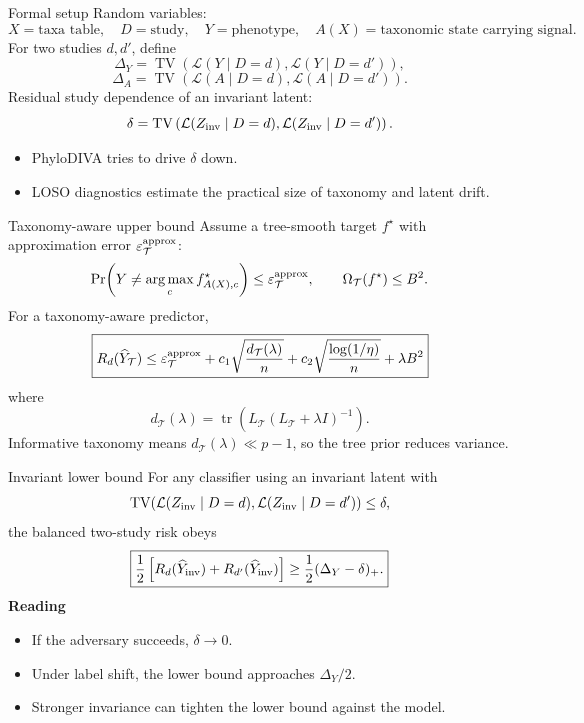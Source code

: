 \documentclass[aspectratio=169,10pt]{beamer}
\newcommand{\TV}{\operatorname{TV}}
\newcommand{\T}{\mathcal T}
\newcommand{\tr}{\operatorname{tr}}
\newcommand{\argmax}{\operatorname*{arg\,max}}
\begin{document}
\begin{frame}{Formal setup}
\small
Random variables:
\[
X=\text{taxa table},\quad D=\text{study},\quad Y=\text{phenotype},\quad
A(X)=\text{taxonomic state carrying signal}.
\]
For two studies \(d,d'\), define
\[
\Delta_Y=\TV(\mathcal L(Y\mid D=d),\mathcal L(Y\mid D=d')),
\]
\[
\Delta_A=\TV(\mathcal L(A\mid D=d),\mathcal L(A\mid D=d')).
\]
Residual study dependence of an invariant latent:
\[
\delta=
\TV\left(
\mathcal L(Z_{\rm inv}\mid D=d),
\mathcal L(Z_{\rm inv}\mid D=d')
\right).
\]
\begin{itemize}
  \item PhyloDIVA tries to drive \(\delta\) down.
  \item LOSO diagnostics estimate the practical size of taxonomy and latent drift.
\end{itemize}
\end{frame}

\begin{frame}{Taxonomy-aware upper bound}
\small
Assume a tree-smooth target \(f^\star\) with approximation error \(\varepsilon_{\T}^{\rm approx}\):
\[
\Pr\!\left(Y\ne \argmax_c f^\star_{A(X),c}\right)\le
\varepsilon_{\T}^{\rm approx},
\qquad
\Omega_{\T}(f^\star)\le B^2.
\]
For a taxonomy-aware predictor,
\[
\boxed{
R_d(\widehat Y_{\T})
\le
\varepsilon_{\T}^{\rm approx}
+c_1\sqrt{\frac{d_{\T}(\lambda)}{n}}
+c_2\sqrt{\frac{\log(1/\eta)}{n}}
+\lambda B^2
}
\]
where
\[
d_{\T}(\lambda)=
\tr\!\left(L_{\T}(L_{\T}+\lambda I)^{-1}\right).
\]
Informative taxonomy means \(d_{\T}(\lambda)\ll p-1\), so the tree prior reduces variance.
\end{frame}

\begin{frame}{Invariant lower bound}
\small
For any classifier using an invariant latent with
\[
\TV(\mathcal L(Z_{\rm inv}\mid D=d),\mathcal L(Z_{\rm inv}\mid D=d'))\le\delta,
\]
the balanced two-study risk obeys
\[
\boxed{
\frac12\left[
R_d(\widehat Y_{\rm inv})+R_{d'}(\widehat Y_{\rm inv})
\right]
\ge
\frac12(\Delta_Y-\delta)_+.
}
\]
\textbf{Reading}
\begin{itemize}
  \item If the adversary succeeds, \(\delta\to0\).
  \item Under label shift, the lower bound approaches \(\Delta_Y/2\).
  \item Stronger invariance can tighten the lower bound against the model.
\end{itemize}
\end{frame}
\end{document}
